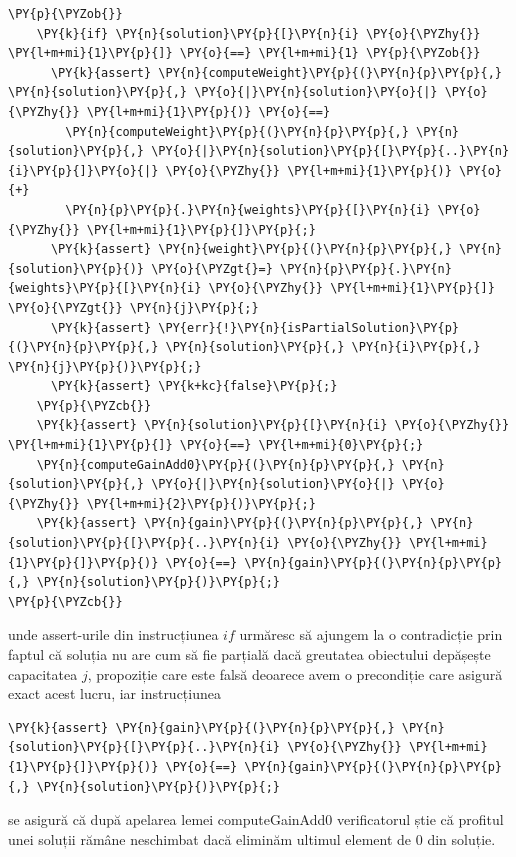 \begin{sloppypar}
\begin{itemize}
\begin{Verbatim}[commandchars=\\\{\}]
 \PY{p}{\PYZob{}}
    \PY{k}{if} \PY{n}{solution}\PY{p}{[}\PY{n}{i} \PY{o}{\PYZhy{}} \PY{l+m+mi}{1}\PY{p}{]} \PY{o}{==} \PY{l+m+mi}{1} \PY{p}{\PYZob{}}
      \PY{k}{assert} \PY{n}{computeWeight}\PY{p}{(}\PY{n}{p}\PY{p}{,} \PY{n}{solution}\PY{p}{,} \PY{o}{|}\PY{n}{solution}\PY{o}{|} \PY{o}{\PYZhy{}} \PY{l+m+mi}{1}\PY{p}{)} \PY{o}{==} 
        \PY{n}{computeWeight}\PY{p}{(}\PY{n}{p}\PY{p}{,} \PY{n}{solution}\PY{p}{,} \PY{o}{|}\PY{n}{solution}\PY{p}{[}\PY{p}{..}\PY{n}{i}\PY{p}{]}\PY{o}{|} \PY{o}{\PYZhy{}} \PY{l+m+mi}{1}\PY{p}{)} \PY{o}{+} 
        \PY{n}{p}\PY{p}{.}\PY{n}{weights}\PY{p}{[}\PY{n}{i} \PY{o}{\PYZhy{}} \PY{l+m+mi}{1}\PY{p}{]}\PY{p}{;}
      \PY{k}{assert} \PY{n}{weight}\PY{p}{(}\PY{n}{p}\PY{p}{,} \PY{n}{solution}\PY{p}{)} \PY{o}{\PYZgt{}=} \PY{n}{p}\PY{p}{.}\PY{n}{weights}\PY{p}{[}\PY{n}{i} \PY{o}{\PYZhy{}} \PY{l+m+mi}{1}\PY{p}{]} \PY{o}{\PYZgt{}} \PY{n}{j}\PY{p}{;}
      \PY{k}{assert} \PY{err}{!}\PY{n}{isPartialSolution}\PY{p}{(}\PY{n}{p}\PY{p}{,} \PY{n}{solution}\PY{p}{,} \PY{n}{i}\PY{p}{,} \PY{n}{j}\PY{p}{)}\PY{p}{;}
      \PY{k}{assert} \PY{k+kc}{false}\PY{p}{;}
    \PY{p}{\PYZcb{}}
    \PY{k}{assert} \PY{n}{solution}\PY{p}{[}\PY{n}{i} \PY{o}{\PYZhy{}} \PY{l+m+mi}{1}\PY{p}{]} \PY{o}{==} \PY{l+m+mi}{0}\PY{p}{;}
    \PY{n}{computeGainAdd0}\PY{p}{(}\PY{n}{p}\PY{p}{,} \PY{n}{solution}\PY{p}{,} \PY{o}{|}\PY{n}{solution}\PY{o}{|} \PY{o}{\PYZhy{}} \PY{l+m+mi}{2}\PY{p}{)}\PY{p}{;}
    \PY{k}{assert} \PY{n}{gain}\PY{p}{(}\PY{n}{p}\PY{p}{,} \PY{n}{solution}\PY{p}{[}\PY{p}{..}\PY{n}{i} \PY{o}{\PYZhy{}} \PY{l+m+mi}{1}\PY{p}{]}\PY{p}{)} \PY{o}{==} \PY{n}{gain}\PY{p}{(}\PY{n}{p}\PY{p}{,} \PY{n}{solution}\PY{p}{)}\PY{p}{;}
\PY{p}{\PYZcb{}}
\end{Verbatim}
    unde assert-urile din instrucțiunea $if$ urmăresc să ajungem la o contradicție prin faptul că soluția nu are cum să fie parțială dacă greutatea obiectului depășește capacitatea $j$, propoziție care este falsă deoarece avem o precondiție care asigură exact acest lucru, iar instrucțiunea 
    \begin{Verbatim}[commandchars=\\\{\}]
\PY{k}{assert} \PY{n}{gain}\PY{p}{(}\PY{n}{p}\PY{p}{,} \PY{n}{solution}\PY{p}{[}\PY{p}{..}\PY{n}{i} \PY{o}{\PYZhy{}} \PY{l+m+mi}{1}\PY{p}{]}\PY{p}{)} \PY{o}{==} \PY{n}{gain}\PY{p}{(}\PY{n}{p}\PY{p}{,} \PY{n}{solution}\PY{p}{)}\PY{p}{;}
\end{Verbatim}
    se asigură că după apelarea lemei computeGainAdd0 verificatorul știe că profitul unei soluții rămâne neschimbat dacă eliminăm ultimul element de 0 din soluție. \par

\end{itemize}
\end{sloppypar}
